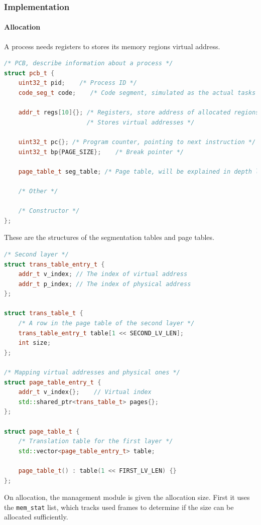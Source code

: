 \documentclass[]{article}
\begin{document}
\subsubsection{Implementation}
\paragraph{Allocation}
A process needs registers to stores its memory regions virtual address. 
\begin{lstlisting}[language=C++]
/* PCB, describe information about a process */
struct pcb_t {
	uint32_t pid;    /* Process ID */
	code_seg_t code;    /* Code segment, simulated as the actual tasks */
	
	addr_t regs[10]{}; /* Registers, store address of allocated regions */
					   /* Stores virtual addresses */
	
	uint32_t pc{}; /* Program counter, pointing to next instruction */
	uint32_t bp{PAGE_SIZE};    /* Break pointer */
	
	page_table_t seg_table; /* Page table, will be explained in depth later */

	/* Other */
	
	/* Constructor */
};
\end{lstlisting}
These are the structures of the segmentation tables and page tables.
\begin{lstlisting}[language=C++]
/* Second layer */
struct trans_table_entry_t {
	addr_t v_index; // The index of virtual address
	addr_t p_index; // The index of physical address
};

struct trans_table_t {
	/* A row in the page table of the second layer */
	trans_table_entry_t table[1 << SECOND_LV_LEN];
	int size;
};

/* Mapping virtual addresses and physical ones */
struct page_table_entry_t {
	addr_t v_index{};    // Virtual index
	std::shared_ptr<trans_table_t> pages{};
};

struct page_table_t {
	/* Translation table for the first layer */
	std::vector<page_table_entry_t> table;
	
	page_table_t() : table(1 << FIRST_LV_LEN) {}
};
\end{lstlisting}
On allocation, the management module is given the allocation size. First it uses the \lstinline|mem_stat| list, which tracks used frames to determine if the size can be allocated sufficiently.
\end{document}
